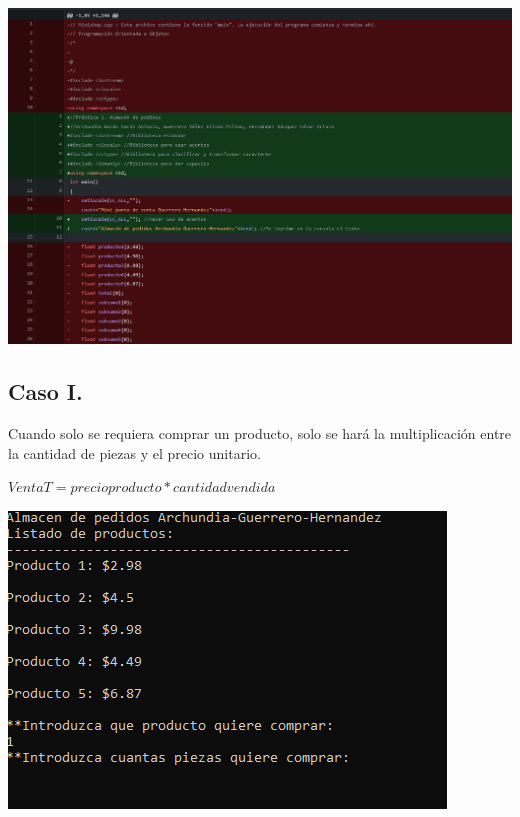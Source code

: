 \documentclass{article}
\begin{document}
\begin{center} 
	\includegraphics[scale=0.2]{Images/Captura de pantalla (214).png}
	\label{figura3b}
\end{center}

\clearpage

\subsection*{Caso I.}
Cuando solo se requiera comprar un producto, solo se hará la multiplicación entre la cantidad de piezas y el precio unitario.      
\begin{center}
\begin{large}
        $ VentaT =  precioproducto * cantidadvendida $
\end{large}
\end{center}
        
    \begin{center} 
	\includegraphics[scale=0.5]{Images/Paso1.PNG}
	\label{figura3C}
\end{center}
\end{document}
